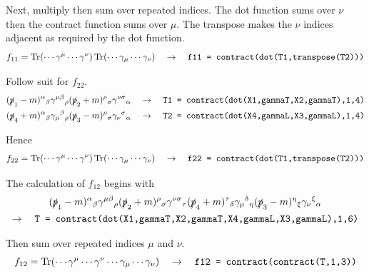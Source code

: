 \documentclass[12pt]{article}
\begin{document}
\noindent
Next, multiply then sum over repeated indices.
The dot function sums over $\nu$ then the contract function
sums over $\mu$. The transpose makes the $\nu$ indices adjacent
as required by the dot function.
$$
f_{11}=
\mathop{\rm Tr}(\cdots\gamma^\mu\cdots\gamma^\nu)
\mathop{\rm Tr}(\cdots\gamma_\mu\cdots\gamma_\nu)
\quad\rightarrow\quad
\text{\tt f11 = contract(dot(T1,transpose(T2)))}
$$

\noindent
Follow suit for $f_{22}$.
\begin{align*}
(\slashed{p}_1-m)^\alpha{}_\beta
\gamma^{\mu\beta}{}_\rho
(\slashed{p}_2+m)^\rho{}_\sigma
\gamma^{\nu\sigma}{}_\alpha
\quad&\rightarrow\quad
\text{\tt T1 = contract(dot(X1,gammaT,X2,gammaT),1,4)}
\\
(\slashed{p}_4+m)^\alpha{}_\beta
\gamma_\mu{}^\beta{}_\rho
(\slashed{p}_3-m)^\rho{}_\sigma
\gamma_\nu{}^\sigma{}_\alpha
\quad&\rightarrow\quad
\text{\tt T2 = contract(dot(X4,gammaL,X3,gammaL),1,4)}
\end{align*}

\noindent
Hence
$$
f_{22}=
\mathop{\rm Tr}(\cdots\gamma^\mu\cdots\gamma^\nu)
\mathop{\rm Tr}(\cdots\gamma_\mu\cdots\gamma_\nu)
\quad\rightarrow\quad
\text{\tt f22 = contract(dot(T1,transpose(T2)))}
$$

\noindent
The calculation of $f_{12}$ begins with
\begin{multline*}
(\slashed{p}_1-m)^\alpha{}_\beta
\gamma^{\mu\beta}{}_\rho
(\slashed{p}_2+m)^\rho{}_\sigma
\gamma^{\nu\sigma}{}_\tau
(\slashed{p}_4+m)^\tau{}_\delta
\gamma_\mu{}^\delta{}_\eta
(\slashed{p}_3-m)^\eta{}_\xi
\gamma_\nu{}^\xi{}_\alpha
\\
\rightarrow\quad
\text{\tt T = contract(dot(X1,gammaT,X2,gammaT,X4,gammaL,X3,gammaL),1,6)}
\end{multline*}

\noindent
Then sum over repeated indices $\mu$ and $\nu$.
$$
f_{12}=\mathop{\rm Tr}(\cdots\gamma^\mu\cdots\gamma^\nu\cdots\gamma_\mu\cdots\gamma_\nu)
\quad\rightarrow\quad
\text{\tt f12 = contract(contract(T,1,3))}
$$


\end{document}
